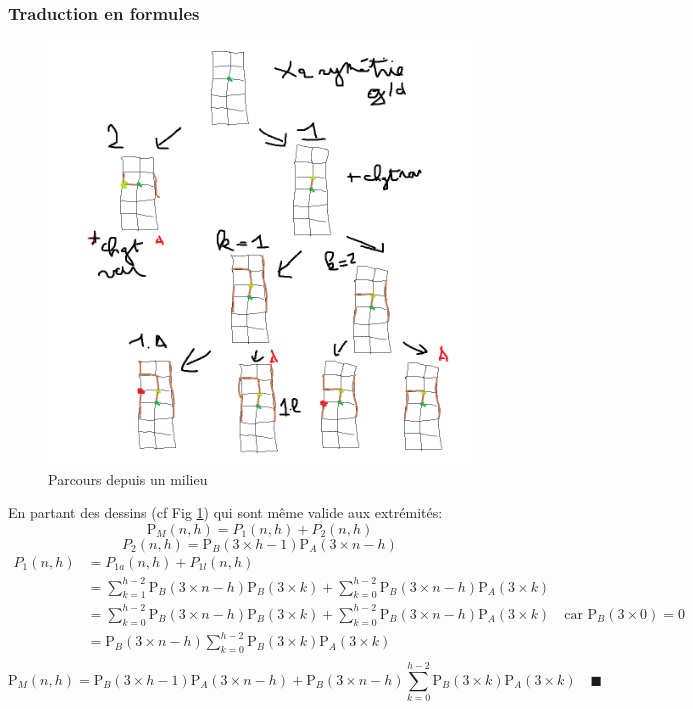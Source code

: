 \documentclass[twoside, a4paper, 12pt]{report}
\newcommand{\cqfd}[1][\quad]{\ensuremath{#1\blacksquare}}
\newcommand{\pa}[2]{\ensuremath{\text{P}_A\left(#1 \times #2\right)}}
\newcommand{\pb}[2]{\ensuremath{\text{P}_B\left(#1 \times #2\right)}}
\newcommand{\Pm}[1]{\ensuremath{\text{P}_M\left(#1\right)}}
\begin{document}
\subsubsection{Traduction en formules}
\begin{figure}[h]
\centering\includegraphics[angle=0, scale=0.4]{milieux_3.png}
\caption{Parcours depuis un milieu}
\label{milieux_3}
\end{figure}

En partant des dessins (cf Fig \ref{milieux_3}) qui sont même valide aux extrémités:
$$\Pm{n, h} = P_1(n, h) + P_2(n, h) $$
$$P_2(n, h) = \pb{3}{h-1} \pa{3}{n -h}$$
\begin{align}
P_1(n, h) &= P_{1a}(n, h) + P_{1l}(n, h)\\
&= \sum_{k=1}^{h-2} \pb{3}{n-h} \pb{3}{k} + \sum_{k=0}^{h-2} \pb{3}{n-h} \pa{3}{k}\\
&= \sum_{k=0}^{h-2} \pb{3}{n-h} \pb{3}{k} + \sum_{k=0}^{h-2} \pb{3}{n-h} \pa{3}{k} \quad \text{car } \pb{3}{0} = 0\\
&=  \pb{3}{n-h} \sum_{k=0}^{h-2} \pb{3}{k} \pa{3}{k}\\
\end{align}
$$\Pm{n, h} =\pb{3}{h-1} \pa{3}{n -h} + \pb{3}{n-h} \sum_{k=0}^{h-2} \pb{3}{k} \pa{3}{k}  \cqfd$$
\end{document}
